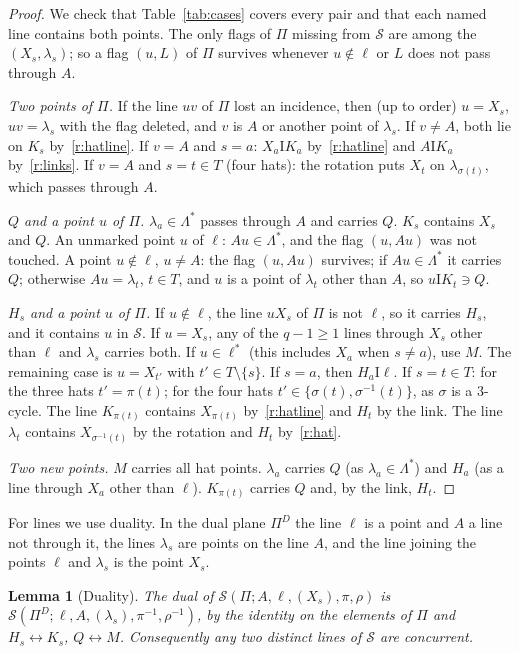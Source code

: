 \documentclass[11pt]{amsart}
\newtheorem{lemma}[theorem]{Lemma}
\theoremstyle{definition}
\theoremstyle{remark}
\newcommand{\I}{\mathrel{\mathrm{I}}}
\newcommand{\cS}{\mathcal{S}}
\newcommand{\lam}{\lambda}
\begin{document}
\begin{proof}
We check that Table~\ref{tab:cases} covers every pair and that each named line contains both points. The only flags of $\Pi$ missing from $\cS$ are among the $(X_s,\lam_s)$; so a flag $(u,L)$ of $\Pi$ survives whenever $u\notin\ell$ or $L$ does not pass through $A$.

\emph{Two points of $\Pi$.} If the line $uv$ of $\Pi$ lost an incidence, then (up to order) $u=X_s$, $uv=\lam_s$ with the flag deleted, and $v$ is $A$ or another point of $\lam_s$. If $v\neq A$, both lie on $K_s$ by~\ref{r:hatline}. If $v=A$ and $s=a$: $X_a\I K_a$ by~\ref{r:hatline} and $A\I K_a$ by~\ref{r:links}. If $v=A$ and $s=t\in T$ (four hats): the rotation puts $X_t$ on $\lam_{\sigma(t)}$, which passes through $A$.

\emph{$Q$ and a point $u$ of $\Pi$.} $\lam_a\in\Lambda^*$ passes through $A$ and carries $Q$. $K_s$ contains $X_s$ and $Q$. An unmarked point $u$ of $\ell$: $Au\in\Lambda^*$, and the flag $(u,Au)$ was not touched. A point $u\notin\ell$, $u\ne A$: the flag $(u,Au)$ survives; if $Au\in\Lambda^*$ it carries $Q$; otherwise $Au=\lam_t$, $t\in T$, and $u$ is a point of $\lam_t$ other than $A$, so $u\I K_t\ni Q$.

\emph{$H_s$ and a point $u$ of $\Pi$.} If $u\notin\ell$, the line $uX_s$ of $\Pi$ is not $\ell$, so it carries $H_s$, and it contains $u$ in $\cS$. If $u=X_s$, any of the $q-1\ge1$ lines through $X_s$ other than $\ell$ and $\lam_s$ carries both. If $u\in\ell^*$ (this includes $X_a$ when $s\neq a$), use $M$. The remaining case is $u=X_{t'}$ with $t'\in T\setminus\{s\}$. If $s=a$, then $H_a\I\ell$. If $s=t\in T$: for the three hats $t'=\pi(t)$; for the four hats $t'\in\{\sigma(t),\sigma^{-1}(t)\}$, as $\sigma$ is a $3$-cycle. The line $K_{\pi(t)}$ contains $X_{\pi(t)}$ by~\ref{r:hatline} and $H_t$ by the link. The line $\lam_t$ contains $X_{\sigma^{-1}(t)}$ by the rotation and $H_t$ by~\ref{r:hat}.

\emph{Two new points.} $M$ carries all hat points. $\lam_a$ carries $Q$ (as $\lam_a\in\Lambda^*$) and $H_a$ (as a line through $X_a$ other than $\ell$). $K_{\pi(t)}$ carries $Q$ and, by the link, $H_t$.
\end{proof}

For lines we use duality. In the dual plane $\Pi^D$ the line $\ell$ is a point and $A$ a line not through it, the lines $\lam_s$ are points on the line $A$, and the line joining the points $\ell$ and $\lam_s$ is the point $X_s$.

\begin{lemma}[Duality]\label{lem:dual}
The dual of $\cS(\Pi;A,\ell,(X_s),\pi,\rho)$ is $\cS(\Pi^D;\ell,A,(\lam_s),\pi^{-1},\rho^{-1})$, by the identity on the elements of $\Pi$ and $H_s\leftrightarrow K_s$, $Q\leftrightarrow M$. Consequently any two distinct lines of $\cS$ are concurrent.
\end{lemma}
\end{document}
